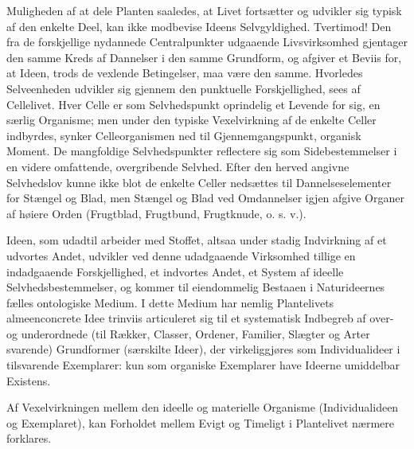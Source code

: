 \documentclass[11pt]{book}
\newcommand{\opage}[1]{\marginnote{\footnotesize\textit{[#1]}}}
\begin{document}
Muligheden af at dele Planten saaledes, at Livet fortsætter og
udvikler sig typisk af den enkelte Deel, kan ikke modbevise Ideens
Selvgyldighed. Tvertimod! Den fra de forskjellige nydannede
Centralpunkter udgaaende Livsvirksomhed gjentager den samme Kreds af
Dannelser i den samme Grundform, og afgiver et Beviis for, at Ideen,
trods de vexlende Betingelser, maa være den samme. Hvorledes
Selveenheden udvikler sig gjennem den punktuelle Forskjellighed, sees
af Cellelivet. Hver Celle er som Selvhedspunkt oprindelig et Levende
for sig, en særlig Organisme; men under den typiske Vexelvirkning af
de enkelte Celler indbyrdes, synker Celleorganismen ned til
Gjennemgangspunkt, organisk Moment. De mangfoldige Selvhedspunkter
reflectere sig som Sidebestemmelser i en videre omfattende,
overgribende Selvhed. Efter den herved angivne Selvhedslov kunne ikke
blot de enkelte Celler nedsættes til Dannelseselementer for Stængel og
Blad, men Stængel og Blad ved Omdannelser igjen afgive Organer af
høiere Orden (Frugtblad, Frugtbund, Frugtknude, o. s. v.).

Ideen, som udadtil arbeider med Stoffet, altsaa under stadig
Indvirkning af et udvortes Andet, udvikler ved denne udadgaaende
Virksomhed tillige en indadgaaende Forskjellighed, et indvortes Andet,
et System af ideelle Selvhedsbestemmelser, og kommer til eiendommelig
Bestaaen i Naturideernes fælles ontologiske Medium. I dette Medium
har nemlig Plantelivets almeenconcrete Idee trinviis articuleret sig
til et systematisk Indbegreb af over- og underordnede (til Rækker,
Classer,
\opage{268} \setcounter{footnote}{0}%
Ordener, Familier, Slægter og Arter svarende) Grundformer
(særskilte Ideer), der virkeliggjøres som Individualideer i
tilsvarende Exemplarer: kun som organiske Exemplarer have Ideerne
umiddelbar Existens.

Af Vexelvirkningen mellem den ideelle og materielle Organisme
(Individualideen og Exemplaret), kan Forholdet mellem Evigt og
Timeligt i Plantelivet nærmere forklares.
\end{document}
